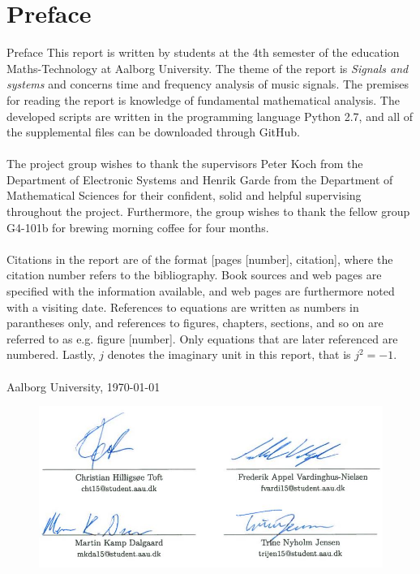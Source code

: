 \clearpage
\chapter*{Preface}
{Preface}
This report is written by students at the 4th semester of the education Maths-Technology at Aalborg University. The theme of the report is \textit{Signals and systems} and concerns time and frequency analysis of music signals. The premises for reading the report is knowledge of fundamental mathematical analysis. The developed scripts are written in the programming language Python 2.7, and all of the supplemental files can be downloaded through GitHub.
\\ \\
The project group wishes to thank the supervisors Peter Koch from the Department of Electronic Systems and Henrik Garde from the Department of Mathematical Sciences for their confident, solid and helpful supervising throughout the project. Furthermore, the group wishes to thank the fellow group G4-101b for brewing morning coffee for four months.
\\ \\
Citations in the report are of the format [pages [number], citation], where the citation number refers to the bibliography. Book sources and web pages are specified with the information available, and web pages are furthermore noted with a visiting date. References to equations are written as numbers in parantheses only, and references to figures, chapters, sections, and so on are referred to as e.g. figure [number]. Only equations that are later referenced are numbered. Lastly, $j$ denotes the imaginary unit in this report, that is $j^2 = -1$.
\\ \\
\vspace{\baselineskip}\hfill Aalborg University, \today
\vfill\noindent

\begin{figure}[H]
\centering
\includegraphics[width = \textwidth]{figures/preface.jpg}
\end{figure}